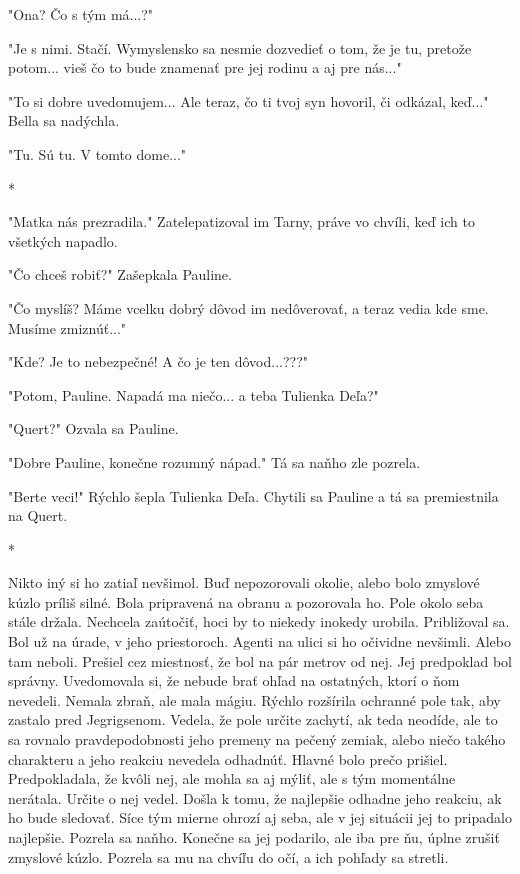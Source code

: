 \documentclass{book}
\begin{document}
"$ $Ona? Čo s tým má...?"$ $ 

"$ $Je s nimi. Stačí. Wymyslensko sa nesmie dozvedieť o tom, že je tu, pretože potom... vieš čo to bude znamenať pre jej rodinu a aj pre nás..."$ $ 

"$ $To si dobre uvedomujem... Ale teraz, čo ti tvoj syn hovoril, či odkázal, keď..."$ $  Bella sa nadýchla.

"$ $Tu. Sú tu. V tomto dome..."$ $ 

\begin{center}

*

\end{center}

"$ $Matka nás prezradila."$ $  Zatelepatizoval im Tarny, práve vo chvíli, keď ich to všetkých napadlo.

"$ $Čo chceš robiť?"$ $  Zašepkala Pauline.

"$ $Čo myslíš? Máme vcelku dobrý dôvod im nedôverovať, a teraz vedia kde sme. Musíme zmiznúť..."$ $ 

"$ $Kde? Je to nebezpečné! A čo je ten dôvod...???"$ $ 

"$ $Potom, Pauline. Napadá ma niečo... a teba Tulienka Deľa?"$ $ 

"$ $Quert?"$ $  Ozvala sa Pauline.

"$ $Dobre Pauline, konečne rozumný nápad."$ $  Tá sa naňho zle pozrela.

"$ $Berte veci!"$ $  Rýchlo šepla Tulienka Deľa. Chytili sa Pauline a tá sa premiestnila na Quert.

\begin{center}

*

\end{center}

Nikto iný si ho zatiaľ nevšimol. Buď nepozorovali okolie, alebo bolo zmyslové kúzlo príliš silné. Bola pripravená na obranu a pozorovala ho. Pole okolo seba stále držala. Nechcela zaútočiť, hoci by to niekedy inokedy urobila. Približoval sa. Bol už na úrade, v jeho priestoroch. Agenti na ulici si ho očividne nevšimli. Alebo tam neboli. Prešiel cez miestnosť, že bol na pár metrov od nej. Jej predpoklad bol správny. Uvedomovala si, že nebude brať ohľad na ostatných, ktorí o ňom nevedeli. Nemala zbraň, ale mala mágiu. Rýchlo rozšírila ochranné pole tak, aby zastalo pred Jegrigsenom. Vedela, že pole určite zachytí, ak teda neodíde, ale to sa rovnalo pravdepodobnosti jeho premeny na pečený zemiak, alebo niečo takého charakteru a jeho reakciu nevedela odhadnúť. Hlavné bolo prečo prišiel. Predpokladala, že kvôli nej, ale mohla sa aj mýliť, ale s tým momentálne nerátala. Určite o nej vedel. Došla k tomu, že najlepšie odhadne jeho reakciu, ak ho bude sledovať. Síce tým mierne ohrozí aj seba, ale v jej situácii jej to pripadalo najlepšie. Pozrela sa naňho. Konečne sa jej podarilo, ale iba pre ňu, úplne zrušiť zmyslové kúzlo. Pozrela sa mu na chvíľu do očí, a ich pohľady sa stretli.
\end{document}
